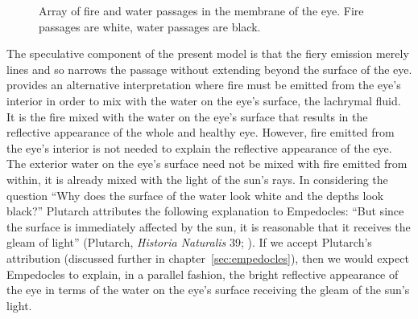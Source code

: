 \begin{figure}[ht]
    \begin{center}
    \end{center}
    \caption{Array of fire and water passages in the membrane of the eye. Fire passages are white, water passages are black.}
    \label{fig:1}
\end{figure}

The speculative component of the present model is that the fiery emission merely lines and so narrows the passage without extending beyond the surface of the eye. \citet{Sedley:1992uq} provides an alternative interpretation where fire must be emitted from the eye's interior in order to mix with the water on the eye's surface, the lachrymal fluid. It is the fire mixed with the water on the eye's surface that results in the reflective appearance of the whole and healthy eye. However, fire emitted from the eye's interior is not needed to explain the reflective appearance of the eye. The exterior water on the eye's surface need not be mixed with fire emitted from within, it is already mixed with the light of the sun's rays. In considering the question ``Why does the surface of the water look white and the depths look black?'' Plutarch attributes the following explanation to Empedocles: ``But since the surface is immediately affected by the sun, it is reasonable that it receives the gleam of light''  (Plutarch, \emph{Historia Naturalis} 39; \citealt[\textsc{ctxt}-87 137--138]{Inwood:2001ve}). If we accept Plutarch's attribution (discussed further in chapter~\ref{sec:empedocles}), then we would expect Empedocles to explain, in a parallel fashion, the bright reflective appearance of the eye in terms of the water on the eye's surface receiving the gleam of the sun's light.

